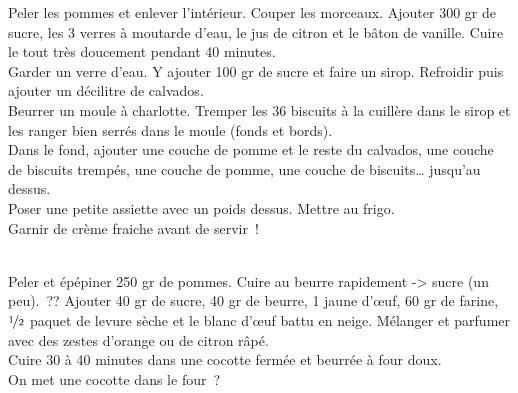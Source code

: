 \begin{minipage}[c]{\textwidth}
Peler les pommes et enlever l’intérieur. Couper les morceaux. Ajouter 300 gr de sucre, les 3 verres à moutarde d’eau, le jus de citron et le bâton de vanille. Cuire le tout très doucement pendant 40 minutes. \\
Garder un verre d’eau. Y ajouter 100 gr de sucre et faire un sirop. Refroidir puis ajouter un décilitre de calvados. \\
Beurrer un moule à charlotte. Tremper les 36 biscuits à la cuillère dans le sirop et les ranger bien serrés dans le moule (fonds et bords). \\
Dans le fond, ajouter une couche de pomme et le reste du calvados, une couche de biscuits trempés, une couche de pomme, une couche de biscuits… jusqu’au dessus. \\
Poser une petite assiette avec un poids dessus. Mettre au frigo. \\
Garnir de crème fraiche avant de servir !\\
\\

\end{minipage}

\begin{minipage}[c]{\textwidth}
Peler et épépiner 250 gr de pommes. Cuire au beurre rapidement -> sucre (un peu). ?? Ajouter 40 gr de sucre, 40 gr de beurre, 1 jaune d’œuf, 60 gr de farine, $\nicefrac{1}{2}$ paquet de levure sèche et le blanc d’œuf battu en neige. Mélanger et parfumer avec des zestes d’orange ou de citron râpé. \\
Cuire 30 à 40 minutes dans une cocotte fermée et beurrée à four doux.\\
On met une cocotte dans le four ? \\
\\

\end{minipage}

